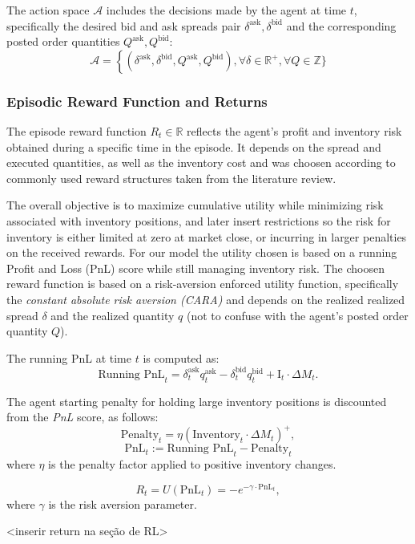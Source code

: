 The action space $\mathcal{A}$ includes the decisions made by the agent at time $t$, specifically the desired bid and ask spreads pair $\delta^{\text{ask}}, \delta^{\text{bid}}$ and the corresponding posted order quantities $Q^{\text{ask}}, Q^{\text{bid}}$:
$$
\mathcal{A} = \left\{ (\delta^{\text{ask}}, \delta^{\text{bid}}, Q^{\text{ask}}, Q^{\text{bid}}), \forall \delta \in \mathbb{R}^+, \forall Q \in \mathbb{Z}\} \right.
$$

\subsubsection{Episodic Reward Function and Returns}

The episode reward function $R_t \in \mathbb{R}$ reflects the agent's profit and inventory risk obtained during a specific time in the episode. It depends on the spread and executed quantities, as well as the inventory cost and was choosen according to commonly used reward structures taken from the literature review.

The overall objective is to maximize cumulative utility while minimizing risk associated with inventory positions, and later insert restrictions so the risk for inventory is either limited at zero at market close, or incurring in larger penalties on the received rewards. For our model the utility chosen is based on a running Profit and Loss (PnL) score while still managing inventory risk. The choosen reward function is based on a risk-aversion enforced utility function, specifically the \textit{constant absolute risk aversion (CARA)} and depends on the realized realized spread $\delta$ and the realized quantity $q$ (not to confuse with the agent's posted order quantity $Q$).

The running PnL at time $t$ is computed as:
$$
\text{Running PnL}_t = \delta_t^{\text{ask}} q_t^{\text{ask}} - \delta_t^{\text{bid}} q_t^{\text{bid}} + \text{I}_t \cdot \Delta M_t.
$$

The agent starting penalty for holding large inventory positions  is discounted from the \textit{PnL} score, as follows:
$$
\text{Penalty}_t = \eta \left( \text{Inventory}_t \cdot \Delta M_t \right)^+,
$$
$$
\text{PnL}_t := \text{Running PnL}_t - \text{Penalty}_t
$$
where \( \eta \) is the penalty factor applied to positive inventory changes.

$$
R_t = U(\text{PnL}_t) = -e^{-\gamma \cdot \text{PnL}_t},
$$
where \( \gamma \) is the risk aversion parameter.

<inserir return na seção de RL>

